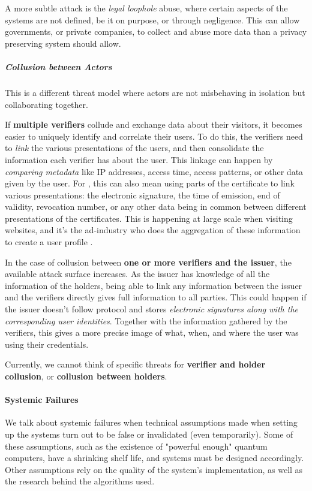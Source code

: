 A more subtle attack is the \emph{legal loophole} abuse, where certain aspects of the systems
are not defined, be it on purpose, or through negligence.
This can allow governments, or private companies, to collect and abuse
more data than a privacy preserving system should allow.

\subparagraph{Collusion between Actors}

This is a different threat model where actors are not misbehaving in isolation but collaborating together.

If \textbf{multiple verifiers} collude and exchange data about their visitors,
it becomes easier to uniquely identify and correlate their users.
To do this, the verifiers need to \emph{link} the various presentations of the users,
and then consolidate the information each verifier has about the user.
This linkage can happen by \emph{comparing metadata} like IP addresses, access
time, access patterns, or other data given by the user.
For \eid, this can also mean using parts of the certificate to link various presentations:
 the electronic signature, the time of emission, end of validity, revocation number,
or any other data being in common between different presentations of the certificates.
This is happening at large scale when visiting websites, and it's the ad-industry who
does the aggregation of these information to create a user profile \cite{BARW16}.

In the case of collusion between \textbf{one or more verifiers and the issuer},
the available attack surface increases.
As the issuer has knowledge of all the information of the holders, being able to
link any information between the issuer and the verifiers directly gives full
information to all parties.
This could happen if the issuer doesn't follow protocol and stores
\emph{electronic signatures along with the corresponding user identities}.
Together with the information gathered by the verifiers, this gives a more precise
image of what, when, and where the user was using their credentials.

Currently, we cannot think of specific threats for \textbf{verifier and holder collusion},
or \textbf{collusion between holders}.

\paragraph{Systemic Failures}

We talk about systemic failures when technical assumptions made when setting up the systems turn out to be false or invalidated (even temporarily).
Some of these assumptions, such as the existence of "powerful enough" quantum computers, have a shrinking shelf life, and systems must be designed accordingly.
Other assumptions rely on the quality of the system's implementation, as well as
the research behind the algorithms used.

